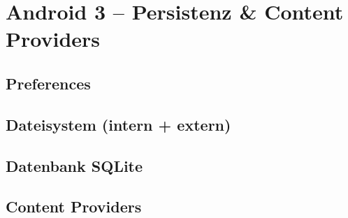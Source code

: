 \chapter{Android 3 – Persistenz \& Content Providers}

\section{Preferences}

\section{Dateisystem (intern + extern)}

\section{Datenbank SQLite}

\section{Content Providers}